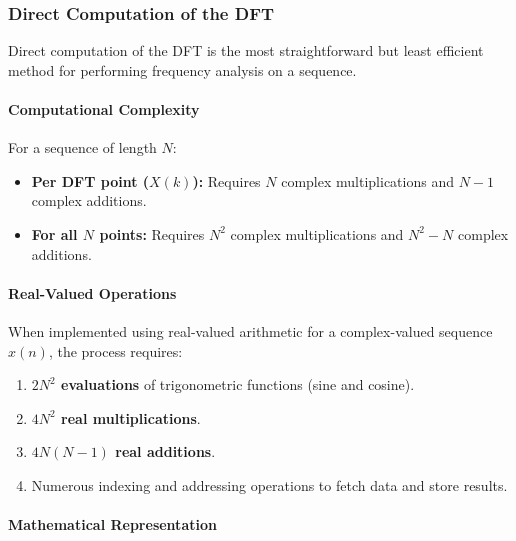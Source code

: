 \hypertarget{direct-computation-of-the-dft}{%
\subsubsection{Direct Computation of the
DFT}\label{direct-computation-of-the-dft}}

Direct computation of the DFT is the most straightforward but least
efficient method for performing frequency analysis on a sequence.

\hypertarget{computational-complexity}{%
\paragraph{Computational Complexity}\label{computational-complexity}}

For a sequence of length \(N\):

\begin{itemize}
\tightlist
\item
  \textbf{Per DFT point (\(X(k)\)):} Requires \(N\) complex
  multiplications and \(N-1\) complex additions.
\item
  \textbf{For all \(N\) points:} Requires \(N^2\) complex
  multiplications and \(N^2 - N\) complex additions.
\end{itemize}

\hypertarget{real-valued-operations}{%
\paragraph{Real-Valued Operations}\label{real-valued-operations}}

When implemented using real-valued arithmetic for a complex-valued
sequence \(x(n)\), the process requires:

\begin{enumerate}
\def\labelenumi{\arabic{enumi}.}
\tightlist
\item
  \textbf{\(2N^2\) evaluations} of trigonometric functions (sine and
  cosine).
\item
  \textbf{\(4N^2\) real multiplications}.
\item
  \textbf{\(4N(N-1)\) real additions}.
\item
  Numerous indexing and addressing operations to fetch data and store
  results.
\end{enumerate}

\hypertarget{mathematical-representation}{%
\paragraph{Mathematical
Representation}\label{mathematical-representation}}

